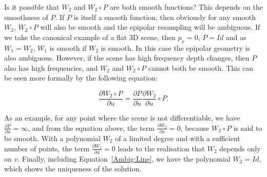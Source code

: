 \documentclass{ipol}
\newcommand{\RR}{\ensuremath{\mathbb{R}}}
\newcommand{\PiZVert}{\widetilde{\pi}_1^{\mathcal{Z}} }
\newcommand{\DerPart}[2]{\frac{\partial #1}{\partial #2}}
\begin{document}
%
%
%
%
%
%
Is it possible that $W_2$ and $W_2 \circ P$ are both smooth functions? This depends on the smoothness of $P$.
%
If $P$ is itself a smooth function, then obviously for any smooth $W_2$,  $W_2 \circ P$  will
also be smooth and the epipolar resampling will be ambiguous. If we take the canonical example of a flat 3D scene, then $p_x=0$,  $P=Id$ and as $W_1=W_2$, $W_1$ is smooth if $W_2$ is smooth. 
In this case the epipolar geometry is also ambiguous.
%
However, if the scene has high frequency depth changes, then $P$ also has high frequencies,
and  $W_2$ and $W_2 \circ P$ cannot both be smooth. This can be seen more formally
by the following equation:

\begin{equation}
   \DerPart{W_2 \circ P}{u} = \DerPart{P}{u} \DerPart{W_2} {u} \circ P.  \label{DerParW2P}
\end{equation}

{As an example, for any point where the scene is not differentiable,
we have $ \DerPart{P}{u}= \infty$, and from the equation above, the term $ \DerPart{W_2} {u}=0$, because $W_2 \circ P$ is said to be smooth. With a polynomial $W_2$ of a limited degree and with a sufficient number of points, the term $ \DerPart{W_2} {u}=0$ leads to the realisation that $W_2$ depends only on $v$. Finally, including Equation~\eqref{Ambig:Line},
we have the polynomial $W_2=Id$, which shows the uniqueness of the solution.
%
}
\end{document}
